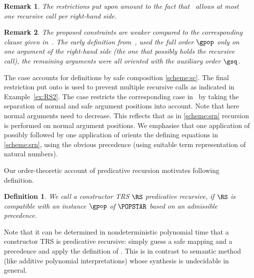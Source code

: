 \documentclass{LMCS}
\newtheorem{definition}[thm]{Definition}
\newtheorem*{remark}{Remark}
\begin{document}
\begin{remark}
The restrictions put upon  amount to the fact that \POPSTAR\
allows at most one recursive call per right-hand side.  
\end{remark}

\begin{remark}
The proposed constraints are weaker compared to the corresponding clause given 
in~\cite[Definition 4]{AM08}. 
The early definition from~\cite[Definition~4]{AM08}, 
used the full order $\gpop$ only on one argument of the right-hand side 
(the one that possibly holds the recursive call), 
the remaining arguments were all oriented with the auxiliary order $\gsq$. 
\end{remark}

The case  accounts for definitions by safe composition \eqref{scheme:sc}.
The final restriction put onto \cpop{ia} is used to prevent multiple recursive calls
as indicated in Example~\ref{ex:RS2}.
The case  restricts the corresponding case in \MPO\ 
by taking the separation of normal and safe argument positions into account. 
Note that here normal arguments need to decrease. 
This reflects that as in \eqref{scheme:srn} 
recursion is performed on normal argument positions.
We emphasise that one application of  possibly followed by one application of 
orients the defining equations in \eqref{scheme:srn}, using
the obvious precedence (using suitable term representation of natural numbers).

Our order-theoretic account of predicative recursion motivates 
following definition.
\begin{definition}
  We call a constructor TRS $\RS$ \emph{predicative recursive}, if
  $\RS$ is compatible with an instance $\gpop$ of $\POPSTAR$ based on an 
  admissible precedence.
\end{definition}

Note that it can be determined in nondeterministic polynomial
time that a constructor TRS is predicative recursive: simply
guess a safe mapping and a precedence and apply the definition
of \POPSTAR. This is in contrast to semantic method 
(like additive polynomial interpretations) whose synthesis is 
undecidable in general.
\end{document}
